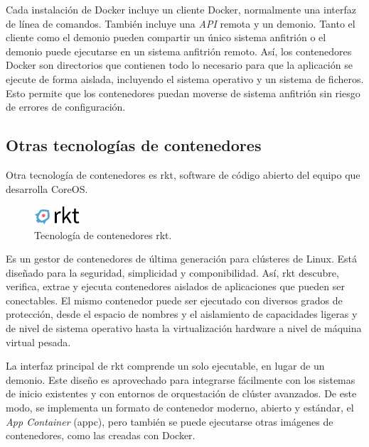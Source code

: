 
Cada instalación de Docker incluye un cliente Docker, normalmente una interfaz de línea de comandos. También incluye una \textit{API} remota y un demonio. Tanto el cliente como el demonio pueden compartir un único sistema anfitrión o el demonio puede ejecutarse en un sistema anfitrión remoto. Así, los contenedores Docker son directorios que contienen todo lo necesario para que la aplicación se ejecute de forma aislada, incluyendo el sistema operativo y un sistema de ficheros. Esto permite que los contenedores puedan moverse de sistema anfitrión sin riesgo de errores de configuración.

\subsection{Otras tecnologías de contenedores}

Otra tecnología de contenedores es rkt, software de código abierto del equipo que desarrolla CoreOS. 

\begin{figure}[H]
\centering
\includegraphics[width=0.15\textwidth]{images/figures/rkt.png}
\caption{Tecnología de contenedores rkt.\footnotemark}
\end{figure}


Es un gestor de contenedores de última generación para clústeres de Linux. Está diseñado para la seguridad, simplicidad y componibilidad. Así, rkt descubre, verifica, extrae y ejecuta contenedores aislados de aplicaciones que pueden ser conectables. El mismo contenedor puede ser ejecutado con diversos grados de protección, desde el espacio de nombres y el aislamiento de capacidades ligeras y de nivel de sistema operativo hasta la virtualización hardware a nivel de máquina virtual pesada.

La interfaz principal de rkt comprende un solo ejecutable, en lugar de un demonio. Este diseño es aprovechado para integrarse fácilmente con los sistemas de inicio existentes y con entornos de orquestación de clúster avanzados. De este modo, se implementa un formato de contenedor moderno, abierto y estándar, el \textit{App Container} (appc), pero también se puede ejecutarse otras imágenes de contenedores, como las creadas con Docker.

